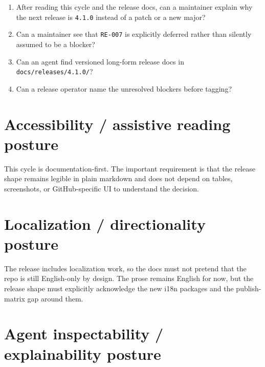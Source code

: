 \begin{enumerate}
\def\labelenumi{\arabic{enumi}.}
\tightlist
\item
  After reading this cycle and the release docs, can a maintainer explain why the next release is \texttt{4\allowbreak{}.\allowbreak{}1\allowbreak{}.\allowbreak{}0} instead of a patch or a new major?
\item
  Can a maintainer see that \texttt{R\allowbreak{}E\allowbreak{}-\allowbreak{}0\allowbreak{}0\allowbreak{}7} is explicitly deferred rather than silently assumed to be a blocker?
\item
  Can an agent find versioned long-form release docs in \texttt{d\allowbreak{}o\allowbreak{}c\allowbreak{}s\allowbreak{}/\allowbreak{}r\allowbreak{}e\allowbreak{}l\allowbreak{}e\allowbreak{}a\allowbreak{}s\allowbreak{}e\allowbreak{}s\allowbreak{}/\allowbreak{}4\allowbreak{}.\allowbreak{}1\allowbreak{}.\allowbreak{}0\allowbreak{}/}?
\item
  Can a release operator name the unresolved blockers before tagging?
\end{enumerate}

\section{Accessibility / assistive reading posture}\label{record-202-accessibility-assistive-reading-posture}

This cycle is documentation-first. The important requirement is that the release shape remains legible in plain markdown and does not depend on tables, screenshots, or GitHub-specific UI to understand the decision.

\section{Localization / directionality posture}\label{record-202-localization-directionality-posture}

The release includes localization work, so the docs must not pretend that the repo is still English-only by design. The prose remains English for now, but the release shape must explicitly acknowledge the new i18n packages and the publish-matrix gap around them.

\section{Agent inspectability / explainability posture}\label{record-202-agent-inspectability-explainability-posture}

